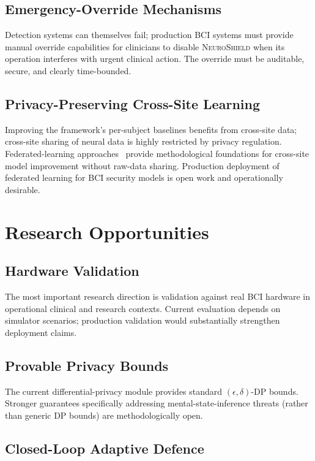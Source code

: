 \documentclass[sigconf,nonacm]{acmart}
\begin{document}
\subsection{Emergency-Override Mechanisms}

Detection systems can themselves fail; production BCI systems must
provide manual override capabilities for clinicians to disable
\textsc{NeuroShield} when its operation interferes with urgent
clinical action. The override must be auditable, secure, and
clearly time-bounded.

\subsection{Privacy-Preserving Cross-Site Learning}

Improving the framework's per-subject baselines benefits from
cross-site data; cross-site sharing of neural data is highly
restricted by privacy regulation. Federated-learning
approaches~\cite{kairouz2024fedml} provide methodological
foundations for cross-site model improvement without raw-data
sharing. Production deployment of federated learning for BCI
security models is open work and operationally desirable.

\section{Research Opportunities}

\subsection{Hardware Validation}

The most important research direction is validation against
real BCI hardware in operational clinical and research contexts.
Current evaluation depends on simulator scenarios; production
validation would substantially strengthen deployment claims.

\subsection{Provable Privacy Bounds}

The current differential-privacy module provides standard
$(\epsilon, \delta)$-DP bounds. Stronger guarantees specifically
addressing mental-state-inference threats (rather than generic DP
bounds) are methodologically open.

\subsection{Closed-Loop Adaptive Defence}
\end{document}
